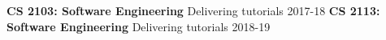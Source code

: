 


\begin{cvhonors}

  \cvhonor
    {\textbf{CS 2103: Software Engineering}} %
    {Delivering tutorials} %
    {} %
    {2017-18} %
  \cvhonor
    {\textbf{CS 2113: Software Engineering}} %
    {Delivering tutorials} %
    {} %
    {2018-19} %


\end{cvhonors}